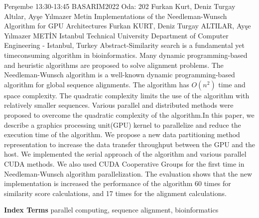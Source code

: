 
    \begin{abstract_basarim}
    {Perşembe 13:30-13:45}
    {BASARIM2022}
    {Oda: 202}
    {Furkan Kurt, Deniz Turgay Altılar, Ayşe Yılmazer Metin}
    {Implementations of the Needleman-Wunsch Algorithm for GPU Architectures}
    {%
    Furkan KURT, Deniz Turgay ALTILAR, Ayşe Yılmazer METİN}
    {%
    }
    {%
    Istanbul Technical University Department of Computer Engineering - Istanbul, Turkey}
    Abstract-Similarity search is a fundamental yet timeconsuming algorithm in bioinformatics. Many dynamic programming-based and heuristic algorithms are proposed to solve alignment problems. The Needleman-Wunsch algorithm is a well-known dynamic programming-based algorithm for global sequence alignments. The algorithm has $O\left(n^{2}\right)$ time and space complexity. The quadratic complexity limits the use of the algorithm with relatively smaller sequences. Various parallel and distributed methods were proposed to overcome the quadratic complexity of the algorithm.\newline In this paper, we describe a graphics processing unit(GPU) kernel to parallelize and reduce the execution time of the algorithm. We propose a new data partitioning method representation to increase the data transfer throughput between the GPU and the host. We implemented the serial approach of the algorithm and various parallel CUDA methods. We also used CUDA Cooperative Groups for the first time in Needleman-Wunsch algorithm parallelization. The evaluation shows that the new implementation is increased the performance of the algorithm 60 times for similarity score calculations, and 17 times for the alignment calculations. 
    
            \textbf{Index Terms} \newline{}parallel computing, sequence alignment, bioinformatics
    \end{abstract_basarim}
    